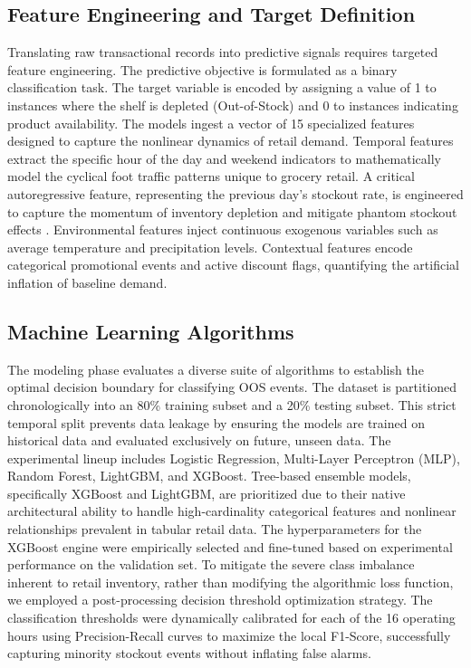 \documentclass[11pt, a4paper]{article}
\begin{document}
\subsection{Feature Engineering and Target Definition}
Translating raw transactional records into predictive signals requires targeted feature engineering. The predictive objective is formulated as a binary classification task. The target variable is encoded by assigning a value of 1 to instances where the shelf is depleted (Out-of-Stock) and 0 to instances indicating product availability. The models ingest a vector of 15 specialized features designed to capture the nonlinear dynamics of retail demand. Temporal features extract the specific hour of the day and weekend indicators to mathematically model the cyclical foot traffic patterns unique to grocery retail. A critical autoregressive feature, representing the previous day's stockout rate, is engineered to capture the momentum of inventory depletion and mitigate phantom stockout effects \cite{kang2005shrinkage, chen2015}. Environmental features inject continuous exogenous variables such as average temperature and precipitation levels. Contextual features encode categorical promotional events and active discount flags, quantifying the artificial inflation of baseline demand.

\subsection{Machine Learning Algorithms}
The modeling phase evaluates a diverse suite of algorithms to establish the optimal decision boundary for classifying OOS events. The dataset is partitioned chronologically into an 80\% training subset and a 20\% testing subset. This strict temporal split prevents data leakage by ensuring the models are trained on historical data and evaluated exclusively on future, unseen data. The experimental lineup includes Logistic Regression, Multi-Layer Perceptron (MLP), Random Forest, LightGBM, and XGBoost. Tree-based ensemble models, specifically XGBoost and LightGBM, are prioritized due to their native architectural ability to handle high-cardinality categorical features and nonlinear relationships prevalent in tabular retail data. The hyperparameters for the XGBoost engine were empirically selected and fine-tuned based on experimental performance on the validation set. To mitigate the severe class imbalance inherent to retail inventory, rather than modifying the algorithmic loss function, we employed a post-processing decision threshold optimization strategy. The classification thresholds were dynamically calibrated for each of the 16 operating hours using Precision-Recall curves to maximize the local F1-Score, successfully capturing minority stockout events without inflating false alarms.
\end{document}
